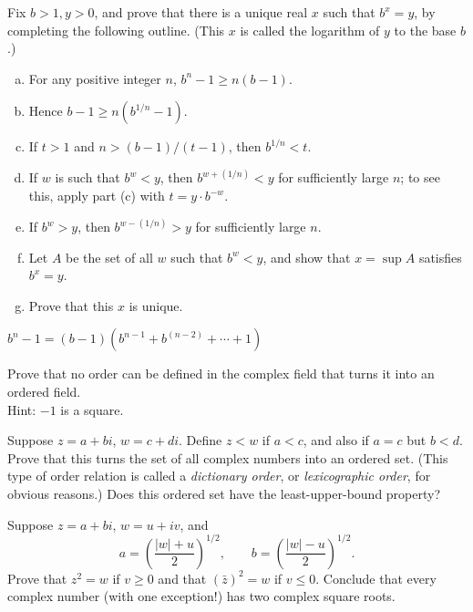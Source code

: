 
\begin{myExercise}
    Fix $b>1, y>0$, and prove that there is a unique real $x$ such that $b^x =y$, by
    completing the following outline. (This $x$ is called the logarithm of $y$ to the base $b$.)
    \begin{enumerate}[(a)]
        \item For any positive integer $n$, $b^n - 1 \geq n(b- 1)$.
        \item Hence $b- 1 \geq n(b^{1/n}- 1)$.
        \item If $t>1$ and $n> (b-1)/(t- 1)$, then $b^{1/n} < t$.
        \item If $w$ is such that $b^w < y$, then $b^{w+(1/n)} < y$ for sufficiently large $n$; to see this, apply part (c) with $t =y \cdot b^{-w}$.
        \item If $b^w > y$, then $b^{w-(1/n)} > y$ for sufficiently large $n$.
        \item Let $A$ be the set of all $w$ such that $b^w < y$, and show that $x = \sup A$ satisfies $b^x =y$.
        \item Prove that this $x$ is unique.
    \end{enumerate}
\end{myExercise}
\mySolve
    \begin{asparaenum}[(a)]
        \item $b^n - 1 = (b-1)(b^{n-1} + b^(n-2) + \cdots + 1)$
    \end{asparaenum}



\begin{myExercise}
    Prove that no order can be defined in the complex field that turns it into an ordered field. \\
    Hint: $-1$ is a square.
\end{myExercise}

\begin{myExercise}
    Suppose $z=a+ bi$, $w=c+di$. Define $z<w$ if $a<c$, and also if $a=c$ but
    $b < d$. Prove that this turns the set of all complex numbers into an ordered set.
    (This type of order relation is called a \emph{dictionary order}, or \emph{lexicographic order}, for
    obvious reasons.) Does this ordered set have the least-upper-bound property?
\end{myExercise}

\begin{myExercise}    
    Suppose $z = a + bi$, $w =u + iv$, and
    \begin{equation*}
        a = \left(\frac{|w|+u}{2}\right)^{1/2},\qquad
        b = \left(\frac{|w|-u}{2}\right)^{1/2}.
    \end{equation*}
    Prove that $z^2 = w$ if $v \geq 0$ and that $(\bar{z})^2 = w$ if $v \leq 0$. Conclude that every complex
    number (with one exception!) has two complex square roots.
\end{myExercise}


